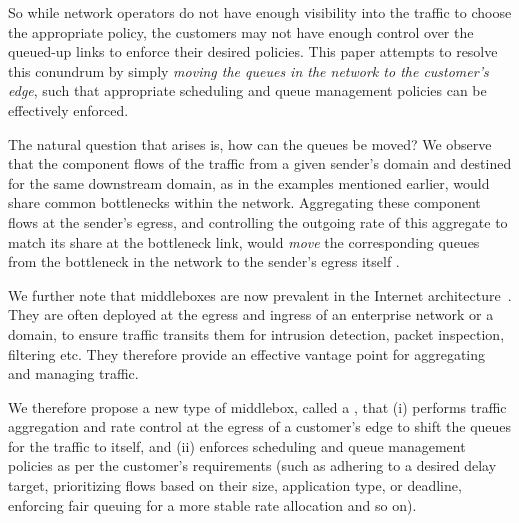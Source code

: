 So while network operators do not have enough visibility into the traffic to choose the appropriate policy, the customers may not have enough control over the queued-up links to enforce their desired policies. This paper attempts to resolve this conundrum by simply \emph{moving the queues in the network to the customer's edge}, such that appropriate scheduling and queue management policies can be effectively enforced.

The natural question that arises is, how can the queues be moved? We observe that the component flows of the traffic from a given sender's domain and destined for the same downstream domain, as in the examples mentioned earlier, would share common bottlenecks within the network. Aggregating these component flows at the sender's egress, and controlling the outgoing rate of this aggregate to match its share at the bottleneck link, would \emph{move} the corresponding queues from the bottleneck in the network to the sender's egress itself . 

We further note that middleboxes are now prevalent in the Internet architecture~\cite{aplomb}. They are often deployed at the egress and ingress of an enterprise network or a domain, to ensure traffic transits them for intrusion detection, packet inspection, filtering etc. They therefore provide an effective vantage point for aggregating and managing traffic. 

We therefore propose a new type of middlebox, called a \name, that (i) performs traffic aggregation and rate control at the egress of a customer's edge to shift the queues for the traffic to itself, and (ii) enforces scheduling and queue management policies as per the customer's requirements (such as adhering to a desired delay target, prioritizing flows based on their size, application type, or deadline, enforcing fair queuing for a more stable rate allocation and so on). 



